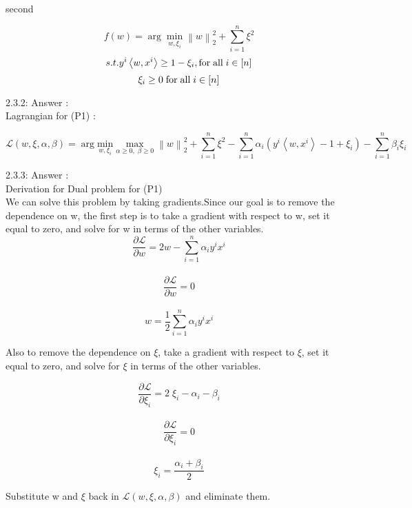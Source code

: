 \documentclass[a4paper,11pt]{article}
\begin{document}
\begin{mlsolution}
second
\end{mlsolution}

\begin{mlsolution}

\[
f(w) = \arg \underset{w, {\xi_{i} }}{\min} \left \| w \right \|_{2}^{2} + \sum_{i = 1}^{n} \xi^{2}
\]\[
\\
s.t. y^{i} \left \langle w, x^{i} \right \rangle \geq 1 - \xi_{i}, \text{for} \; \text{all} \; i \in [n]
\]\[\\
\xi_{i} \geq 0\; \text{for} \; \text{all} \; i \in [n]
\]

2.3.2: Answer :\\

Lagrangian for (P1) :

\[
\mathcal{L}(w, \xi, \alpha, \beta) = \arg \underset{w, {\xi_{i} }}{ \text{min} } \; \underset{\alpha\geq 0 ,\; \beta\geq0}{\text{max}} \; \left \| w \right \|_{2}^{2} + \sum_{i = 1}^{n} \xi^{2}
 - \sum_{i=1}^{n} \alpha_{i} \left ( y^{i} \left \langle w, x^{i} \right \rangle - 1 + \xi_{i} \right ) - \sum_{i=1}^{n}\beta_{i} \xi_{i}
\]

2.3.3: Answer :\\

Derivation for Dual problem for (P1)\\

We can solve this problem by taking gradients.Since our goal is to remove the dependence on w, the first step is to take a gradient with respect to w, set it equal to zero, and solve for w in terms of the other variables.\\
\[
\frac{\partial  \mathcal{L}}{\partial w} = 2w - \sum_{i=1}^{n} \alpha_{i}y^{i}x^{i} 
\]\\\[
\frac{\partial  \mathcal{L}}{\partial w}  = 0
\]\\\[
w = \frac{1}{2}\sum_{i=1}^{n} \alpha_{i}y^{i}x^{i} 
\]

Also to remove the dependence on $\xi$, take a gradient with respect to $\xi$, set it equal to zero, and solve for $\xi$ in terms of the other variables.

\[
\frac{\partial  \mathcal{L}}{\partial \xi_{i} } = 2\;\xi_{i} - \alpha_{i} - \beta_{i}
\]\\\[
\frac{\partial  \mathcal{L}}{\partial \xi_{i} } = 0
\]\\\[
\xi_{i} = \frac{\alpha_{i} + \beta_{i}}{2}
\]

Substitute w and $\xi$ back in $\mathcal{L}(w, \xi, \alpha, \beta)$ and eliminate them.


\end{mlsolution}
\end{document}
